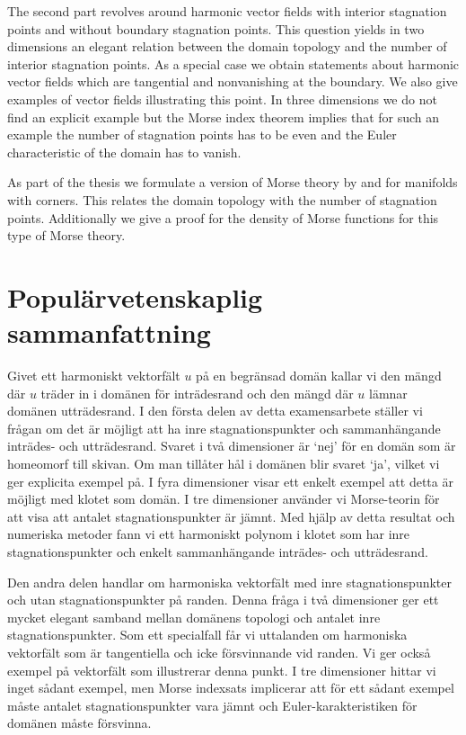 The second part revolves around harmonic vector fields
with interior stagnation points and without boundary stagnation points.
This question yields in two dimensions an elegant relation between the
domain topology and the number of interior stagnation points. 
As a special case we obtain statements about harmonic vector fields which are tangential and nonvanishing 
at the boundary.
We also give examples of vector fields illustrating this point.
In three dimensions we do not find an explicit example but the Morse index theorem implies
that for such an example the number of stagnation points has to be even and
the Euler characteristic of the domain has to vanish.

As part of the thesis we formulate a version of Morse theory by \cite{Braess1974} and \cite{Agrach1991}
for manifolds with corners.
This relates the domain topology with the number of stagnation points.
Additionally we give a proof for the density of Morse functions
for this type of Morse theory.

\section*{Populärvetenskaplig sammanfattning}

Givet ett harmoniskt vektorfält $u$ på en begränsad domän kallar vi den mängd där $u$ träder in i
domänen för inträdesrand och den mängd där $u$ lämnar domänen utträdesrand. I den första
delen av detta examensarbete ställer vi frågan om det är möjligt att ha inre stagnationspunkter
och sammanhängande inträdes- och utträdesrand. Svaret i två dimensioner är `nej' för en domän som är homeomorf till skivan. Om man tillåter hål i domänen blir svaret `ja', vilket vi
ger explicita exempel på. I fyra dimensioner visar ett enkelt exempel att detta är möjligt med
klotet som domän. I tre dimensioner använder vi Morse-teorin för att visa att antalet
stagnationspunkter är jämnt. Med hjälp av detta resultat och numeriska metoder fann vi ett harmoniskt
polynom i klotet som har inre stagnationspunkter och enkelt sammanhängande inträdes- och
utträdesrand.

Den andra delen handlar om harmoniska vektorfält med inre
stagnationspunkter och utan stagnationspunkter på randen. Denna fråga i två dimensioner ger
ett mycket elegant samband mellan domänens topologi och antalet inre stagnationspunkter.
Som ett specialfall får vi uttalanden om harmoniska vektorfält som är tangentiella  och icke försvinnande vid
randen. Vi ger också exempel på vektorfält som illustrerar denna punkt. I tre dimensioner
hittar vi inget sådant exempel, men Morse indexsats implicerar att för ett sådant exempel
måste antalet stagnationspunkter vara jämnt och Euler-karakteristiken för domänen måste försvinna.

